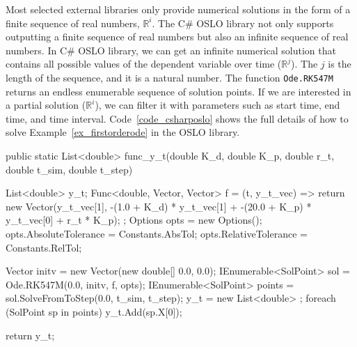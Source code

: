 Most selected external libraries only provide numerical solutions in the form of a finite sequence of real numbers, $\mathbb{R}^i$. The C\# OSLO library not only supports outputting a finite sequence of real numbers but also an infinite sequence of real numbers. In C\# OSLO library, we can get an infinite numerical solution that contains all possible values of the dependent variable over time ($\mathbb{R}^j$). The $j$ is the length of the sequence, and it is a natural number. The function \verb|Ode.RK547M| returns an endless enumerable sequence of solution points. If we are interested in a partial solution ($\mathbb{R}^i$), we can filter it with parameters such as start time, end time, and time interval. Code~\ref{code_csharposlo} shows the full details of how to solve Example~\ref{ex_firstorderode} in the OSLO library.
\begin{listing}[ht]
\begin{csharp1}
public static List<double> func_y_t(double K_d, double K_p, double r_t, double t_sim, double t_step) {
    List<double> y_t;
    Func<double, Vector, Vector> f = (t, y_t_vec) => {
        return new Vector(y_t_vec[1], -(1.0 + K_d) * y_t_vec[1] + -(20.0 + K_p) * y_t_vec[0] + r_t * K_p);
    };
    Options opts = new Options();
    opts.AbsoluteTolerance = Constants.AbsTol;
    opts.RelativeTolerance = Constants.RelTol;
    
    Vector initv = new Vector(new double[] {0.0, 0.0});
    IEnumerable<SolPoint> sol = Ode.RK547M(0.0, initv, f, opts);
    IEnumerable<SolPoint> points = sol.SolveFromToStep(0.0, t_sim, t_step);
    y_t = new List<double> {};
    foreach (SolPoint sp in points) {
        y_t.Add(sp.X[0]);
    }
    
    return y_t;
}
\end{csharp1}
\label{code_csharposlo}
\end{listing}

